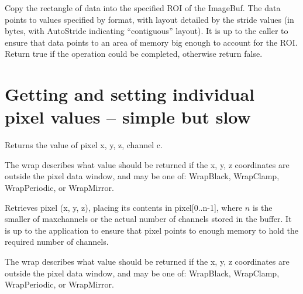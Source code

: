 Copy the rectangle of data into the specified ROI of the ImageBuf. The data
points to values specified by {\cf format}, with layout detailed by the
stride values (in bytes, with {\cf AutoStride} indicating ``contiguous''
layout). It is up to the caller to ensure that data points to an area of
memory big enough to account for the ROI. Return {\cf true} if the operation
could be completed, otherwise return {\cf false}.
\apiend



\section{Getting and setting individual pixel values -- simple but slow}

Returns the value of pixel {\cf x, y, z}, channel {\cf c}.  

The {\cf wrap} describes what value should be returned if the {\cf x, y, z}
coordinates are outside the pixel data window, and may be one of:
{\cf WrapBlack}, {\cf WrapClamp}, {\cf WrapPeriodic}, or {\cf WrapMirror}.
\apiend


Retrieves pixel ({\cf x, y, z}), placing its contents in
{\cf pixel[0..n-1]}, where $n$ is the smaller of {\cf maxchannels}
or the actual number of channels stored in the buffer.  It is up to
the application to ensure that {\cf pixel} points to enough memory
to hold the required number of channels.

The {\cf wrap} describes what value should be returned if the {\cf x, y, z}
coordinates are outside the pixel data window, and may be one of:
{\cf WrapBlack}, {\cf WrapClamp}, {\cf WrapPeriodic}, or {\cf WrapMirror}.
\apiend

